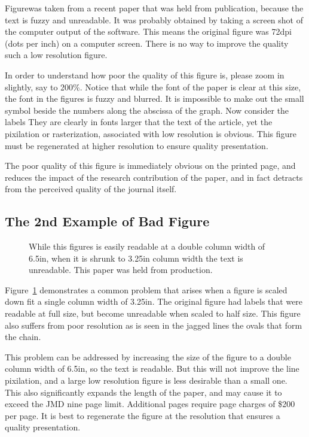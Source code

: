 \documentclass[10pt]{asme2ej}
\begin{document}
 
Figurewas taken from a recent paper that was held from publication, because the text is fuzzy and unreadable.  It was probably obtained by taking a screen shot of the computer output of the  software.  This means the original figure was 72dpi (dots per inch) on a computer screen.  There is no way to improve the quality such a low resolution figure.
 
In order to understand how poor the quality of this figure is, please zoom in slightly, say to 200\%.  Notice that while the font of the paper is clear at this size, the font in the figures is fuzzy and blurred.  It is impossible to make out the small symbol beside the numbers along the abscissa of the graph.  Now consider the labels  They are clearly in fonts larger that the text of the article, yet the pixilation or rasterization, associated with low resolution is obvious. This figure must be regenerated at higher resolution to ensure quality presentation.

The poor quality of this figure is immediately obvious on the printed page, and reduces the impact of the research contribution of the paper, and in fact detracts from the perceived quality of the journal itself.



\subsection{The 2nd Example of Bad Figure}

\begin{figure} 
\centerline{}
\caption{While this figures is easily readable at a double column width of 6.5in, when it is shrunk to 3.25in column width the text is unreadable.   This paper was held from production.}
\label{fig_example2.ps}
\end{figure}

Figure~\ref{fig_example2.ps}
demonstrates a common problem that arises when a figure is scaled down fit a single column width of 3.25in.  The original figure had labels that were readable at full size, but become unreadable when scaled to half size.  This figure also suffers from poor resolution as is seen in the jagged lines the ovals that form the chain.

This problem can be addressed by increasing the size of the figure to a double column width of 6.5in, so the text is readable.  But this will not improve the line pixilation, and a large low resolution figure is less desirable than a small one.  This also significantly expands the length of the paper, and may cause it to exceed the JMD nine page limit.  Additional pages require page charges of \$200 per page.  It is best to regenerate the figure at the resolution that ensures a quality presentation.
\end{document}
